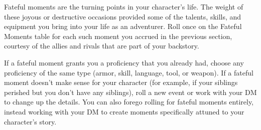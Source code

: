 \documentclass[10pt,a4paper,twoside,bg=print,twocolumn,openany,nodeprecatedcode]{dndbook}
\begin{document}
Fateful moments are the turning points in your character's life. The weight of these joyous or destructive occasions provided some of the talents, skills, and equipment you bring into your life as an adventurer. Roll once on the Fateful Moments table for each such moment you accrued in the previous section, courtesy of the allies and rivals that are part of your backstory.

If a fateful moment grants you a proficiency that you already had, choose any proficiency of the same type (armor, skill, language, tool, or weapon). If a fateful moment doesn't make sense for your character (for example, if your siblings perished but you don't have any siblings), roll a new event or work with your DM to change up the details. You can also forego rolling for fateful moments entirely, instead working with your DM to create moments specifically attuned to your character's story.
\end{document}
